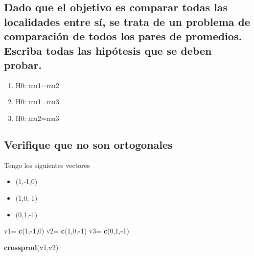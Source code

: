 \documentclass[
]{article}
\newenvironment{Shaded}{\begin{snugshade}}{\end{snugshade}}
\newcommand{\DecValTok}[1]{\textcolor[rgb]{0.00,0.00,0.81}{#1}}
\newcommand{\FunctionTok}[1]{\textcolor[rgb]{0.13,0.29,0.53}{\textbf{#1}}}
\newcommand{\NormalTok}[1]{#1}
\newcommand{\OtherTok}[1]{\textcolor[rgb]{0.56,0.35,0.01}{#1}}
\newcommand{\SpecialCharTok}[1]{\textcolor[rgb]{0.81,0.36,0.00}{\textbf{#1}}}
\providecommand{\tightlist}{%
  \setlength{\itemsep}{0pt}\setlength{\parskip}{0pt}}
\begin{document}
\hypertarget{dado-que-el-objetivo-es-comparar-todas-las-localidades-entre-suxed-se-trata-de-un-problema-de-comparaciuxf3n-de-todos-los-pares-de-promedios.-escriba-todas-las-hipuxf3tesis-que-se-deben-probar.}{%
\subsection{Dado que el objetivo es comparar todas las localidades entre
sí, se trata de un problema de comparación de todos los pares de
promedios. Escriba todas las hipótesis que se deben
probar.}\label{dado-que-el-objetivo-es-comparar-todas-las-localidades-entre-suxed-se-trata-de-un-problema-de-comparaciuxf3n-de-todos-los-pares-de-promedios.-escriba-todas-las-hipuxf3tesis-que-se-deben-probar.}}

\begin{enumerate}
\def\labelenumi{\arabic{enumi}.}
\tightlist
\item
  H0: mu1=mu2
\item
  H0: mu1=mu3
\item
  H0: mu2=mu3
\end{enumerate}

\hypertarget{verifique-que-no-son-ortogonales}{%
\subsection{Verifique que no son
ortogonales}\label{verifique-que-no-son-ortogonales}}

Tengo los siguientes vectores

\begin{itemize}
\tightlist
\item
  (1,-1,0)
\item
  (1,0,-1)
\item
  (0,1,-1)
\end{itemize}

\begin{Shaded}
\begin{Highlighting}[]
\NormalTok{v1}\OtherTok{=} \FunctionTok{c}\NormalTok{(}\DecValTok{1}\NormalTok{,}\SpecialCharTok{{-}}\DecValTok{1}\NormalTok{,}\DecValTok{0}\NormalTok{)}
\NormalTok{v2}\OtherTok{=} \FunctionTok{c}\NormalTok{(}\DecValTok{1}\NormalTok{,}\DecValTok{0}\NormalTok{,}\SpecialCharTok{{-}}\DecValTok{1}\NormalTok{)}
\NormalTok{v3}\OtherTok{=} \FunctionTok{c}\NormalTok{(}\DecValTok{0}\NormalTok{,}\DecValTok{1}\NormalTok{,}\SpecialCharTok{{-}}\DecValTok{1}\NormalTok{)}

\FunctionTok{crossprod}\NormalTok{(v1,v2)}
\end{Highlighting}
\end{Shaded}
\end{document}
